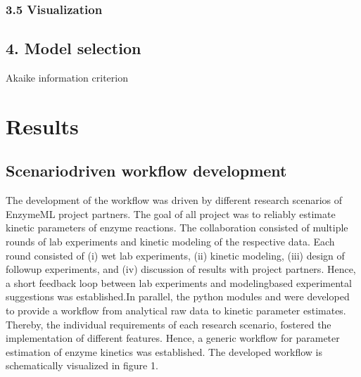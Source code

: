 \documentclass[letterpaper,10pt,english]{jupyterBook}
\begin{document}
\subsection{3.5 Visualization}
\label{\detokenize{methods:visualization}}

\section{4. Model selection}
\label{\detokenize{methods:model-selection}}
\sphinxAtStartPar
Akaike information criterion

\sphinxstepscope


\chapter{Results}
\label{\detokenize{results:results}}\label{\detokenize{results::doc}}

\section{Scenario\sphinxhyphen{}driven workflow development}
\label{\detokenize{results:scenario-driven-workflow-development}}
\sphinxAtStartPar
The development of the workflow was driven by different research scenarios of EnzymeML project partners. The goal of all project was to reliably estimate kinetic parameters of enzyme reactions. The collaboration consisted of multiple rounds of lab experiments and kinetic modeling of the respective data. Each round consisted of (i) wet lab experiments, (ii) kinetic modeling, (iii) design of follow\sphinxhyphen{}up experiments, and (iv) discussion of results with project partners. Hence, a short feedback loop between lab experiments and modeling\sphinxhyphen{}based experimental suggestions was established.In parallel, the python modules {\hyperref[\detokenize{methods:method-calipytion}]{}} and {\hyperref[\detokenize{methods:method-enzymepynetics}]{}} were developed to provide a workflow from analytical raw data to kinetic parameter estimates. Thereby, the individual requirements of each research scenario, fostered the implementation of different features. Hence, a generic workflow for parameter estimation of enzyme kinetics was established. The developed workflow is schematically visualized in figure 1.

\sphinxAtStartPar
{}
\end{document}
